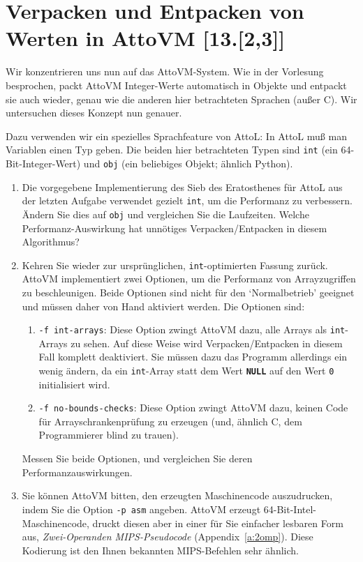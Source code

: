 \documentclass[11pt,a4paper]{article}
\newcommand{\Cty}[1]{\textcolor{dblue}{\texttt{#1}}}
\newcommand{\Ckw}[1]{\textbf{\texttt{#1}}}
\begin{document}
\section{Verpacken und Entpacken von Werten in AttoVM [13.[2,3]]}
Wir konzentrieren uns nun auf das AttoVM-System.  Wie in der Vorlesung
besprochen, packt AttoVM Integer-Werte automatisch in Objekte und
entpackt sie auch wieder, genau wie die anderen hier betrachteten
Sprachen (außer C).  Wir untersuchen dieses Konzept nun genauer.

Dazu verwenden wir ein spezielles Sprachfeature von AttoL:  In AttoL muß man Variablen einen Typ geben.
Die beiden hier betrachteten Typen sind \Cty{int} (ein 64-Bit-Integer-Wert) und \Cty{obj} (ein beliebiges Objekt; ähnlich Python).


\begin{enumerate}
  \item Die vorgegebene Implementierung des Sieb des Eratosthenes für
    AttoL aus der letzten Aufgabe verwendet gezielt \Cty{int}, um die
    Performanz zu verbessern.  Ändern Sie dies auf \Cty{obj} und
    vergleichen Sie die Laufzeiten.  Welche Performanz-Auswirkung hat
    unnötiges Verpacken/Entpacken in diesem Algorithmus?

  \item Kehren Sie wieder zur ursprünglichen, \Cty{int}-optimierten
    Fassung zurück.  AttoVM implementiert zwei Optionen, um die
    Performanz von Arrayzugriffen zu beschleunigen.  Beide Optionen
    sind nicht für den `Normalbetrieb' geeignet und müssen daher von
    Hand aktiviert werden.  Die Optionen sind:

    \begin{enumerate}
      \item \texttt{-f int-arrays}:  Diese Option zwingt AttoVM dazu, alle Arrays als \Cty{int}-Arrays zu sehen.  Auf diese Weise wird
        Verpacken/Entpacken in diesem Fall komplett deaktiviert.  Sie müssen dazu das Programm allerdings ein wenig ändern, da ein \Cty{int}-Array
        statt dem Wert \Ckw{NULL} auf den Wert \texttt{0} initialisiert wird.
      \item \texttt{-f no-bounds-checks}:  Diese Option zwingt AttoVM dazu, keinen Code für Arrayschrankenprüfung zu erzeugen (und, ähnlich
        C, dem Programmierer blind zu trauen).
    \end{enumerate}

    Messen Sie beide Optionen, und vergleichen Sie deren
    Performanzauswirkungen.

  \item Sie können AttoVM bitten, den erzeugten Maschinencode auszudrucken, indem Sie die Option \texttt{-p asm} angeben.
    AttoVM erzeugt 64-Bit-Intel-Maschinencode, druckt diesen aber in einer für Sie einfacher lesbaren Form aus, 
    \emph{Zwei-Operanden MIPS-Pseudocode} (Appendix~\ref{a:2omp}).  Diese Kodierung ist den Ihnen bekannten MIPS-Befehlen sehr ähnlich.


\end{enumerate}
\end{document}
